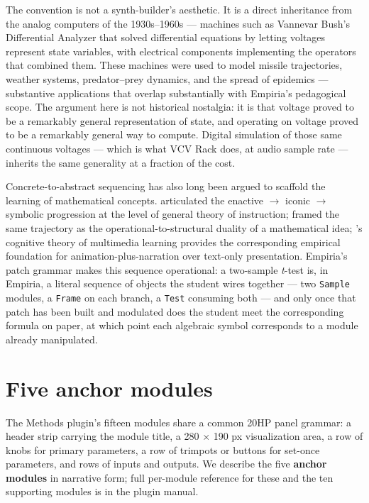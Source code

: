 The convention is not a synth-builder's aesthetic. It is a direct
inheritance from the analog computers of the
1930s--1960s --- machines such as Vannevar Bush's Differential
Analyzer \citep{bush1931} that solved differential equations by
letting voltages represent state variables, with electrical
components implementing the operators that combined them. These
machines were used to model missile trajectories, weather systems,
predator--prey dynamics, and the spread of epidemics
\citep{small2001} --- substantive applications that overlap
substantially with Empiria's pedagogical scope. The argument here
is not historical nostalgia: it is that voltage proved to be a
remarkably general representation of state, and operating on
voltage proved to be a remarkably general way to compute. Digital
simulation of those same continuous voltages --- which is what VCV
Rack does, at audio sample rate --- inherits the same generality at
a fraction of the cost.

Concrete-to-abstract sequencing has also long been argued to
scaffold the learning of mathematical concepts.
\citet{bruner1966} articulated the enactive $\rightarrow$ iconic
$\rightarrow$ symbolic progression at the level of general theory of
instruction; \citet{sfard1991} framed the same trajectory as the
operational-to-structural duality of a mathematical idea;
\citet{mayer2009}'s cognitive theory of multimedia learning provides
the corresponding empirical foundation for animation-plus-narration
over text-only presentation. Empiria's patch grammar makes this
sequence operational: a two-sample \emph{t}-test is, in Empiria, a
literal sequence of objects the student wires together --- two
\texttt{Sample} modules, a \texttt{Frame} on each branch, a
\texttt{Test} consuming both --- and only once that patch has been
built and modulated does the student meet the corresponding formula
on paper, at which point each algebraic symbol corresponds to a
module already manipulated.

\section{Five anchor modules}\label{five-anchor-modules}

The Methods plugin's fifteen modules share a common 20HP panel
grammar: a header strip carrying the module title, a 280 $\times$ 190
px visualization area, a row of knobs for primary parameters, a row
of trimpots or buttons for set-once parameters, and rows of inputs
and outputs. We describe the five \textbf{anchor modules} in
narrative form; full per-module reference for these and the ten
supporting modules is in the plugin manual.

